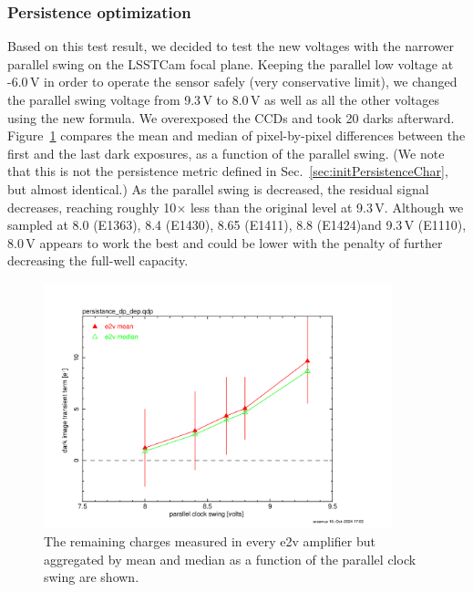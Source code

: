\subsubsection{Persistence optimization}\label{persistence-optimization-1}
Based on this test result, we decided to test the new voltages with
the narrower parallel swing on the LSSTCam focal plane. Keeping the
parallel low voltage at -6.0\,V in order to operate the sensor safely (very
conservative limit), we changed the parallel swing voltage from 9.3\,V to
8.0\,V as well as all the other voltages using the new formula. We
overexposed the CCDs and took 20 darks afterward. Figure~\ref{fig:peristence-swing} compares the
mean and median of pixel-by-pixel differences between the first and the
last dark exposures, as a function of the parallel swing. (We note that this is not the persistence metric defined in Sec.~\ref{sec:initPersistenceChar}, but almost identical.)
As the parallel swing is decreased, the residual signal decreases, reaching
roughly 10$\times$ less than the original level at 9.3\,V. Although we sampled
at 8.0 (E1363), 8.4 (E1430), 8.65 (E1411), 8.8 (E1424)and 9.3\,V (E1110), 8.0\,V appears to work the best and could
be lower with the penalty of further decreasing the full-well capacity.

\begin{figure}[ht]
\begin{centering}
\includegraphics[width=0.9\textwidth]{figures/e2v_transient_dark_vs_dp.png}

\caption{The remaining charges measured in every e2v amplifier but
aggregated by mean and median as a function of the parallel clock swing
are shown.}
\label{fig:peristence-swing}
\end{centering}
\end{figure}


